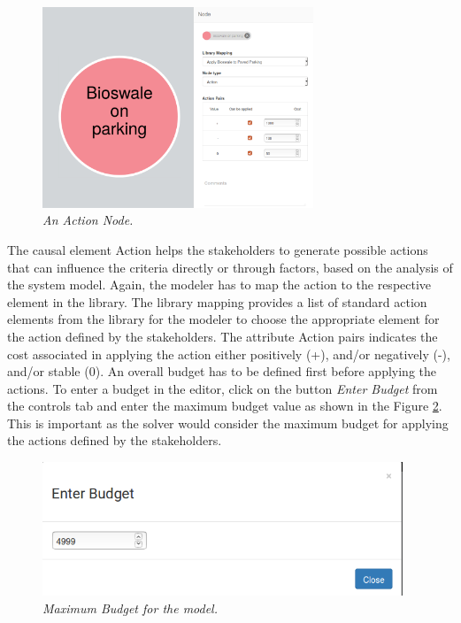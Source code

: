 \documentclass[a4paper]{article}
\begin{document}
\begin{figure}[H]
\begin{center}
\includegraphics[width=0.75\linewidth, height=6cm]{img/action.png}
\caption{\small \sl An Action Node.\label{fig:action}}
\end{center}
\end{figure}

The causal element Action helps the stakeholders to generate possible actions that can influence the criteria directly or through factors, based on the analysis of the system model. Again, the modeler has to map the action to the respective element in the library. The library mapping provides a list of standard action elements from the library for the modeler to choose the appropriate element for the action defined by the stakeholders. The attribute Action pairs indicates the cost associated in applying the action either positively (+), and/or negatively (-), and/or stable (0). An overall budget has to be defined first before applying the actions. To enter a budget in the editor, click on the button \textit{Enter Budget} from the controls tab and enter the maximum budget value as shown in the Figure \ref{fig:budget}. This is important as the solver would consider the maximum budget for applying the actions defined by the stakeholders.

\begin{figure}[H]
\begin{center}
\includegraphics[width=0.75\linewidth, height=4cm]{img/budget.png}
\caption{\small \sl Maximum Budget for the model.\label{fig:budget}}
\end{center}
\end{figure}
\end{document}
